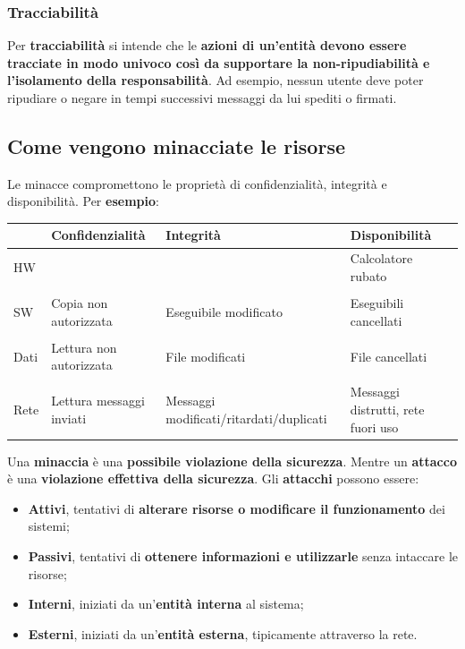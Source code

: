 \documentclass[a4paper]{article}
\begin{document}
	\subsubsection{Tracciabilità}
	
	Per \textcolor{Red3}{\textbf{tracciabilità}} si intende che le \textbf{azioni di un'entità devono essere tracciate in modo univoco così da supportare la non-ripudiabilità e l'isolamento della responsabilità}. Ad esempio, nessun utente deve poter ripudiare o negare in tempi successivi messaggi da lui spediti o firmati.\newpage
	
	\subsection{Come vengono minacciate le risorse} \label{come vengono minacciate le risorse}
	
	Le minacce compromettono le proprietà di confidenzialità, integrità e disponibilità. Per \textcolor{Green4}{\textbf{esempio}}:
	
	\begin{table}[!htp]
		\centering
		\begin{tabular}{@{} l p{9em} p{9em} p{9em} @{}}
			\toprule
			& Confidenzialità & Integrità & Disponibilità \\
			\midrule
			HW & & & Calcolatore rubato \\
			&&&\\
			SW & Copia non autorizzata & Eseguibile modificato & Eseguibili cancellati \\
			&&&\\
			Dati & Lettura non autorizzata & File modificati & File cancellati \\
			&&&\\
			Rete & Lettura messaggi inviati & Messaggi modificati/ritardati/duplicati & Messaggi distrutti, rete fuori uso \\
			\bottomrule
		\end{tabular}
	\end{table}
	
	\noindent
	Una \textcolor{Red3}{\textbf{minaccia}} è una \textbf{possibile violazione della sicurezza}. Mentre un \textcolor{Red3}{\textbf{attacco}} è una \textbf{violazione effettiva della sicurezza}. Gli \textbf{attacchi} possono essere:
	\begin{itemize}
		\item \textbf{Attivi}, tentativi di \textbf{alterare risorse o modificare il funzionamento} dei sistemi;
		
		\item \textbf{Passivi}, tentativi di \textbf{ottenere informazioni e utilizzarle} senza intaccare le risorse;
		
		\item \textbf{Interni}, iniziati da un'\textbf{entità interna} al sistema;
		
		\item \textbf{Esterni}, iniziati da un'\textbf{entità esterna}, tipicamente attraverso la rete.
	\end{itemize}\newpage
	
\end{document}

